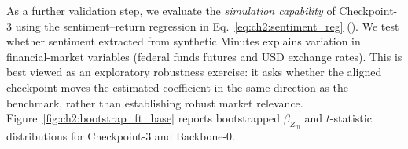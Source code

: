 As a further validation step, we evaluate the \textit{simulation capability} of Checkpoint-3 using the sentiment--return regression in Eq.~\ref{eq:ch2:sentiment_reg} (\citet{tadle2022fomc}). We test whether sentiment extracted from synthetic Minutes explains variation in financial-market variables (federal funds futures and USD exchange rates). This is best viewed as an exploratory robustness exercise: it asks whether the aligned checkpoint moves the estimated coefficient in the same direction as the benchmark, rather than establishing robust market relevance. Figure~\ref{fig:ch2:bootstrap_ft_base} reports bootstrapped $\beta_{Z_m}$ and $t$-statistic distributions for Checkpoint-3 and Backbone-0.


